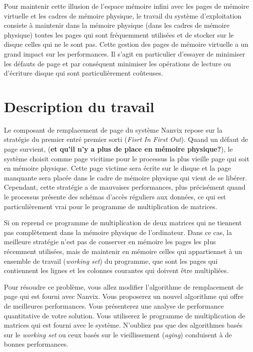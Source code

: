 \documentclass[a4paper,11pt]{article}
\begin{document}
Pour maintenir cette illusion de l'espace mémoire infini avec les
pages de mémoire virtuelle et les cadres de mémoire physique, le
travail du système d'exploitation consiste à maintenir dans la mémoire
physique (dans les cadres de mémoire physique) toutes les pages qui
sont fréquemment utilisées et de stocker sur le disque celles qui ne
le sont pas. Cette gestion des pages de mémoire virtuelle a un grand
impact sur les performances. Il s'agit en particulier d'essayer de
minimiser les défauts de page et par conséquent minimiser les
opérations de lecture ou d'écriture disque qui sont particulièrement
coûteuses.


\section*{Description du travail}

Le composant de remplacement de page du système Nanvix repose sur la
stratégie du premier entré premier sorti ({\em Fisrt In First
  Out}). Quand un défaut de page survient, ({\bf et qu'il n'y a plus
  de place en mémoire physique?}), le système choisit comme page
vicitime pour le processus la plus vieille page qui soit en mémoire
physique. Cette page victime sera écrite sur le disque et la page
manquante sera placée dans le cadre de mémoire physique qui vient de
se libérer. Cependant, cette stratégie a de mauvaises performances,
plus précisément quand le processus présente des schémas d'accès
réguliers aux données, ce qui est particulièrement vrai pour le
programme de multiplication de matrices.

Si on reprend ce programme de multiplication de deux matrices qui ne
tiennent pas complètement dans la mémoire physique de
l'ordinateur. Dans ce cas, la meilleure stratégie n'est pas de
conserver en mémoire les pages les plus récemment utilisées, mais de
maintenir en mémoire celles qui appartiennet à un ensemble de travail
({\em working set}) du programme, que sont les pages qui contiennent
les lignes et les colonnes courantes qui doivent être multipliées.

Pour résoudre ce problème, vous allez modifier l'algorithme de
remplacement de page qui est fourni avec Nanvix. Vous proposerez un
nouvel algorithme qui offre de meilleures performances. Vous
présenterez une analyse de performance quantitative de votre
solution. Vous utiliserez le programme de multiplication de matrices
qui est fourni avec le système. N'oubliez pas que des algorithmes
basés sur le {\em working set} ou ceux basés sur le vieillissement
({\em aging}) conduisent à de bonnes performances.
\end{document}
